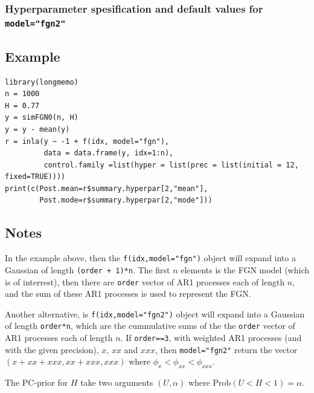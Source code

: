\documentclass[a4paper,11pt]{article}
\begin{document}
\subsubsection*{Hyperparameter spesification and default values for \texttt{model="fgn2"}}


\subsection*{Example}

\begin{verbatim}
library(longmemo)
n = 1000
H = 0.77
y = simFGN0(n, H)
y = y - mean(y)
r = inla(y ~ -1 + f(idx, model="fgn"), 
         data = data.frame(y, idx=1:n),
         control.family =list(hyper = list(prec = list(initial = 12, fixed=TRUE))))
print(c(Post.mean=r$summary.hyperpar[2,"mean"],
        Post.mode=r$summary.hyperpar[2,"mode"]))
\end{verbatim}


\subsection*{Notes}

In the example above, then the \texttt{f(idx,model="fgn")} object will
expand into a Gaussian of length \texttt{(order + 1)*n}. The first $n$
elements is the FGN model (which is of interrest), then there are
\texttt{order} vector of AR1 processes each of length $n$, and the sum
of these AR1 processes is used to represent the FGN.

Another alternative, is \texttt{f(idx,model="fgn2")} object will
expand into a Gaussian of length \texttt{order*n}, which are the
cummulative sums of the the \texttt{order} vector of AR1 processes
each of length $n$. If \texttt{order==3}, with weighted AR1 processes
(and with the given precision), $x$, $xx$ and $xxx$, then
\texttt{model="fgn2"} return the vector $(x+xx+xxx, xx+xxx, xxx)$
where $\phi_{x} < \phi_{xx} < \phi_{xxx}$.



The PC-prior for $H$ take two arguments $(U, \alpha)$ where
$\text{Prob}(U < H < 1) = \alpha$.
\end{document}
